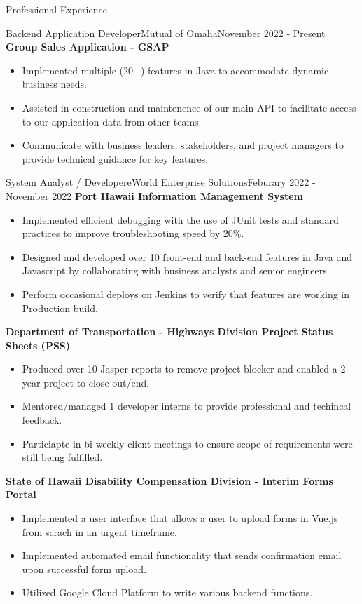 \documentclass[]{mcdowellcv}
\begin{document}
	\makeheader

	\begin{cvsection}{Professional Experience}
		\begin{cvsubsection}{Backend Application Developer}{Mutual of Omaha}{November 2022 - Present}			
			\textbf{Group Sales Application - GSAP}
			\begin{itemize}
				\item Implemented multiple (20+) features in Java to accommodate dynamic business needs.
				\item Assisted in construction and maintenence of our main API to facilitate access to our application data from other teams.
				\item Communicate with business leaders, stakeholders, and project managers to provide technical guidance for key features.
				\end{itemize}
		\end{cvsubsection}
		\begin{cvsubsection}{System Analyst / Developer}{eWorld Enterprise Solutions}{Feburary 2022 - November 2022}
			\textbf{Port Hawaii Information Management System}
			\begin{itemize}
				\item Implemented efficient debugging with the use of JUnit tests and standard practices to improve troubleshooting speed by 20\%.
				\item Designed and developed over 10 front-end and back-end features in Java and Javascript by collaborating with business analysts and senior engineers.
				\item Perform occasional deploys on Jenkins to verify that features are working in Production build.
			\end{itemize}
			\textbf{Department of Transportation - Highways Division Project Status Sheets (PSS)}
			\begin{itemize}
				\item Produced over 10 Jasper reports to remove project blocker and enabled a 2-year project to close-out/end.
				\item Mentored/managed 1 developer interns to provide professional and techincal feedback.
				\item Particiapte in bi-weekly client meetings to ensure scope of requirements were still being fulfilled. 
			\end{itemize}
			\textbf{State of Hawaii Disability Compensation Division - Interim Forms Portal}
			\begin{itemize}
				\item Implemented a user interface that allows a user to upload forms in Vue.js from scrach in an urgent timeframe.
				\item Implemented automated email functionality that sends confirmation email upon successful form upload.
				\item Utilized Google Cloud Platform to write various backend functions.
			\end{itemize}
		\end{cvsubsection}
	\end{cvsection}
		
\end{document}
